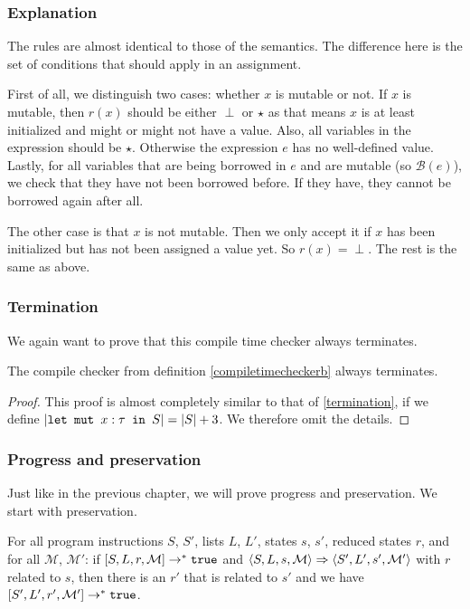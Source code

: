 \subsubsection*{Explanation}
The rules are almost identical to those of the semantics. The difference here is the set of conditions that should apply in an assignment. 

First of all, we distinguish two cases: whether $x$ is mutable or not. If $x$ is mutable, then $r(x)$ should be either $\perp$ or $\star$ as that means $x$ is at least initialized and might or might not have a value. Also, all variables in the expression should be $\star$. Otherwise the expression $e$ has no well-defined value. Lastly, for all variables that are being borrowed in $e$ and are mutable (so $\mathcal{B}(e)$), we check that they have not been borrowed before. If they have, they cannot be borrowed again after all. 

The other case is that $x$ is not mutable. Then we only accept it if $x$ has been initialized but has not been assigned a value yet. So $r(x) = \perp$. The rest is the same as above. 

\subsubsection*{Termination}
We again want to prove that this compile time checker always terminates. 

\begin{theorem}
\label{terminationb}
The compile checker from definition \ref{compiletimecheckerb} always terminates.
\end{theorem}

\begin{proof}
This proof is almost completely similar to that of \ref{termination}, if we define $|\texttt{let mut }x : \tau \texttt{ in } S| = |S| + 3$. We therefore omit the details.
\end{proof}


\subsubsection*{Progress and preservation}
Just like in the previous chapter, we will prove progress and preservation. We start with preservation.

\begin{theorem}
\label{preservationb}
For all program instructions $S$, $S'$, lists $L$, $L'$, states $s$, $s'$, reduced states $r$, and for all $\mathcal{M}$, $\mathcal{M'}$: if $[ S, L, r, \mathcal{M} ] \to ^* \texttt{true}$ and $\langle S, L, s, \mathcal{M} \rangle \Rightarrow \langle S', L', s', \mathcal{M'} \rangle$ with $r$ related to $s$, then there is an $r'$ that is related to $s'$ and we have $[ S', L', r', \mathcal{M'} ] \to ^* \texttt{true}$.
\end{theorem}

